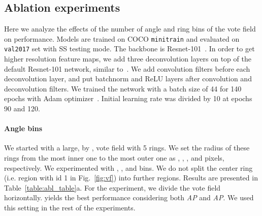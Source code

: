 \documentclass[runningheads]{llncs}
\begin{document}
\subsection{Ablation experiments}
\label{sec:vot_abl}
Here we analyze the effects  of the number of angle and ring bins of the vote field on performance. Models are trained on COCO \texttt{minitrain} and evaluated on \texttt{val2017} set with SS testing mode. The backbone is Resnet-101~\cite{resnet}. In order to get higher resolution feature maps, we add three deconvolution layers on top of the default Resnet-101 network, similar to~\cite{xiao2018simple}. We add  convolution filters before each   deconvolution layer, and put batchnorm and ReLU layers after convolution and deconvolution filters.  We trained the network with a batch size of 44 for 140 epochs with Adam optimizer~\cite{adam}. Initial learning rate  was divided by 10 at epochs 90 and 120.  


\paragraph{\textbf{Angle bins}} We started with a large,  by , vote field with 5 rings. We set the radius of these rings from the most inner one to the most outer one as , , ,  and  pixels, respectively.  
We experimented with , ,  and  bins. We do not split the center ring (i.e. region with id 1 in Fig.~\ref{fig:vf}) into further regions.  Results are presented in Table~\ref{table:abl_table}a. For the  experiment, we divide the vote field horizontally.  yields the best performance considering both  \textit{AP} and  \textit{AP}. We used this setting in the rest of the experiments. 
\end{document}
